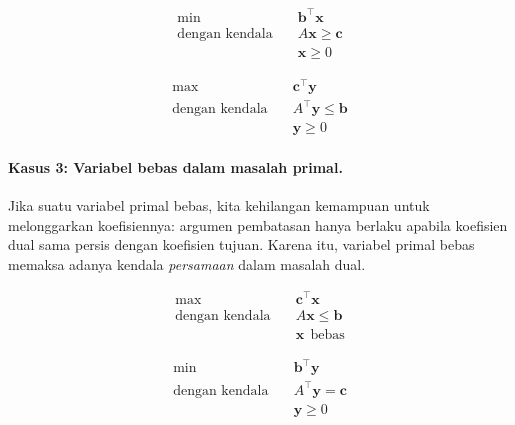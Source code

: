 \par\noindent
\begin{tcolorbox}[title=Primal (P), colback=blue!5, colframe=blue!40!black]
\[
\begin{aligned}
\min\ & \mathbf{b}^\top \mathbf{x} \\
\text{dengan kendala} \quad & A \mathbf{x} \geq \mathbf{c} \\
& \mathbf{x} \geq 0
\end{aligned}
\]
\end{tcolorbox}

\medskip

\begin{tcolorbox}[title=Dual (D), colback=green!5, colframe=green!40!black]
\[
\begin{aligned}
\max\ & \mathbf{c}^\top \mathbf{y} \\
\text{dengan kendala} \quad & A^\top \mathbf{y} \leq \mathbf{b} \\
& \mathbf{y} \geq 0
\end{aligned}
\]
\end{tcolorbox}
\par

\paragraph{Kasus 3: Variabel bebas dalam masalah primal.}
Jika suatu variabel primal bebas, kita kehilangan kemampuan untuk melonggarkan koefisiennya: argumen pembatasan hanya berlaku apabila koefisien dual sama persis dengan koefisien tujuan. Karena itu, variabel primal bebas memaksa adanya kendala \emph{persamaan} dalam masalah dual.

\par\noindent
\begin{tcolorbox}[title=Primal (P), colback=blue!5, colframe=blue!40!black]
\[
\begin{aligned}
\max\ & \mathbf{c}^\top \mathbf{x} \\
\text{dengan kendala} \quad & A \mathbf{x} \leq \mathbf{b} \\
& \mathbf{x} \ \ \text{bebas}
\end{aligned}
\]
\end{tcolorbox}

\medskip

\begin{tcolorbox}[title=Dual (D), colback=green!5, colframe=green!40!black]
\[
\begin{aligned}
\min\ & \mathbf{b}^\top \mathbf{y} \\
\text{dengan kendala} \quad & A^\top \mathbf{y} = \mathbf{c} \\
& \mathbf{y} \geq 0
\end{aligned}
\]
\end{tcolorbox}
\par


